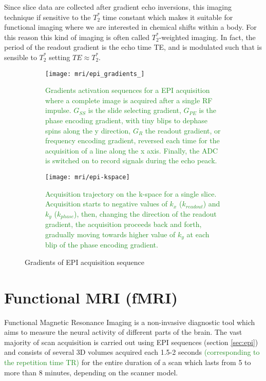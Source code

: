 \documentclass[11pt]{report}
\begin{document}
Since slice data are collected after gradient echo inversions, this imaging technique if sensitive to the $T_2^*$ time constant which makes it suitable for functional imaging where we are interested in chemical shifts within a body. For this reason this kind of imaging is often called $T_2^*$-weighted imaging.
In fact, the period of the readout gradient is the echo time TE, and is modulated such that is sensible to $T_2^{\ast}$ setting $TE \approx T_2^{\ast}$.




\begin{figure}
\begin{subfigure}{0.7\textwidth}
\texttt{[image: mri/epi\_gradients\_]}
\caption{\textcolor{ForestGreen}{Gradients activation sequences for a EPI acquisition where a complete image is acquired after a single RF impulse. $G_{SS}$ is the slide selecting gradient, $G_{PE}$ is the phase encoding gradient, with tiny blips to dephase spins along the y direction, $G_{R}$ the readout gradient, or frequency encoding gradient, reversed each time for the acquisition of a line along the x axis. Finally, the ADC is switched on to record signals during the echo peack.}
}
\label{fig:epi_gradients}
\end{subfigure}
\begin{subfigure}{0.5\textwidth}
\texttt{[image: mri/epi-kspace]}
\caption{\textcolor{ForestGreen}{Acquisition trajectory on the k-space for a single slice. Acquisition starts to negative values of $k_x$ ($k_{readout}$) and $k_y$ ($k_{phase}$), then, changing the direction of the readout gradient, the acquisition proceeds back and forth, gradually moving towards higher value of $k_y$ at each blip of the phase encoding gradient.}}
\label{fig:epi_kspace}
\end{subfigure}
\caption{Gradients of EPI acquisition sequence}
\label{fig:epi}
\end{figure}



\section{Functional MRI (fMRI)}\label{sec:fmri}

Functional Magnetic Resonance Imaging is a non-invasive diagnostic tool which aims to measure the neural activity of different parts of the brain.
The vast majority of scan acquisition is carried out using EPI sequences (section \ref{sec:epi}) and consists of several 3D volumes acquired each 1.5-2 seconds \textcolor{ForestGreen}{(corresponding to the repetition time TR)} for the entire duration of a scan which lasts from 5 to more than 8 minutes, depending on the scanner model.
\end{document}
